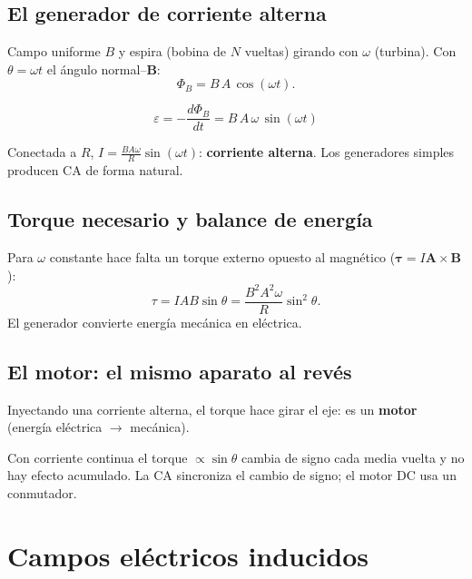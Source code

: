 \documentclass[12pt,a4paper]{article}
\begin{document}
\subsection{El generador de corriente alterna}

Campo uniforme $B$ y espira (bobina de $N$ vueltas) girando con $\omega$
(turbina). Con $\theta = \omega t$ el ángulo normal--$\mathbf{B}$:
\[
\Phi_B = B\,A\,\cos(\omega t).
\]

\begin{keybox}
  \[
  \boxed{\varepsilon = -\frac{d\Phi_B}{dt} = B\,A\,\omega\,\sin(\omega t)}
  \]
\end{keybox}

Conectada a $R$, $I = \tfrac{BA\omega}{R}\sin(\omega t)$: \textbf{corriente
alterna}. Los generadores simples producen CA de forma natural.



\subsection{Torque necesario y balance de energía}

Para $\omega$ constante hace falta un torque externo opuesto al magnético
($\boldsymbol\tau = I\mathbf{A}\times\mathbf{B}$):
\[
\tau = I A B \sin\theta = \frac{B^2 A^2 \omega}{R}\sin^2\theta.
\]
El generador convierte energía mecánica en eléctrica.

\subsection{El motor: el mismo aparato al revés}

Inyectando una corriente alterna, el torque hace girar el eje: es un
\textbf{motor} (energía eléctrica $\to$ mecánica).

\begin{notebox}
  Con corriente continua el torque $\propto\sin\theta$ cambia de signo cada
  media vuelta y no hay efecto acumulado. La CA sincroniza el cambio de signo;
  el motor DC usa un conmutador.
\end{notebox}



\section{Campos eléctricos inducidos}
\end{document}
